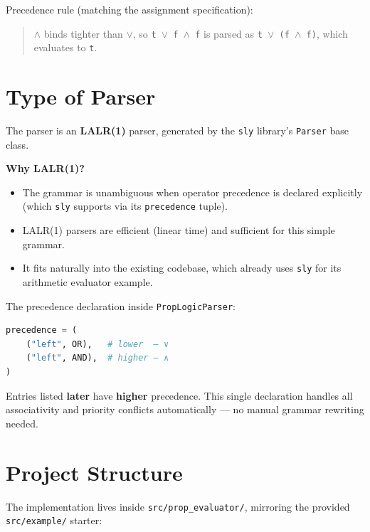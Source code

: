 \documentclass[12pt,a4paper]{article}
\begin{document}
Precedence rule (matching the assignment specification):

\begin{quote}
$\land$ binds tighter than $\lor$, so \texttt{t $\lor$ f $\land$ f} is parsed as \texttt{t $\lor$ (f $\land$ f)}, which
evaluates to \texttt{t}.
\end{quote}

\section{Type of Parser}

The parser is an \textbf{LALR(1)} parser, generated by the \texttt{sly} library's \texttt{Parser}
base class.

\textbf{Why LALR(1)?}

\begin{itemize}
    \item The grammar is unambiguous when operator precedence is declared explicitly
          (which \texttt{sly} supports via its \texttt{precedence} tuple).
    \item LALR(1) parsers are efficient (linear time) and sufficient for this simple
          grammar.
    \item It fits naturally into the existing codebase, which already uses \texttt{sly} for its
          arithmetic evaluator example.
\end{itemize}

The precedence declaration inside \texttt{PropLogicParser}:

\begin{lstlisting}[language=Python]
precedence = (
    ("left", OR),   # lower  — ∨
    ("left", AND),  # higher — ∧
)
\end{lstlisting}

Entries listed \textbf{later} have \textbf{higher} precedence. This single declaration
handles all associativity and priority conflicts automatically --- no manual
grammar rewriting needed.

\section{Project Structure}

The implementation lives inside \texttt{src/prop\_evaluator/}, mirroring the provided
\texttt{src/example/} starter:
\end{document}
